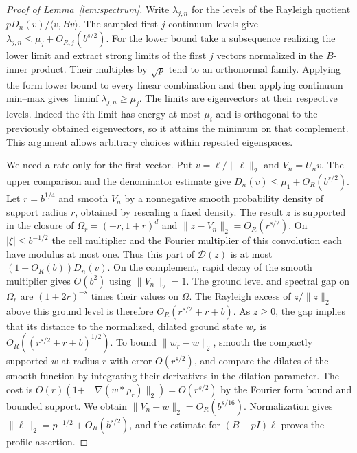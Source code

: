 \documentclass[11pt]{article}
\numberwithin{equation}{section}
\begin{document}
\begin{proof}[Proof of Lemma~\ref{lem:spectrum}]
Write \(\lambda_{j,n}\) for the levels of the Rayleigh quotient
\(pD_n(v)/\langle v,Bv\rangle\). The sampled first \(j\) continuum
levels give \(\lambda_{j,n}\le\mu_j+O_{R,j}(b^{s/2})\). For the
lower bound take a subsequence realizing the lower limit and extract
strong limits of the first \(j\) vectors normalized in the
\(B\)-inner product. Their multiples by \(\sqrt p\) tend to an
orthonormal family. Applying the form lower bound to every linear
combination and then applying continuum min--max gives
\(\liminf\lambda_{j,n}\ge\mu_j\). The limits are eigenvectors at
their respective levels. Indeed the $i$th limit has energy at most
\(\mu_i\) and is orthogonal to the previously obtained eigenvectors,
so it attains the minimum on that complement. This argument allows
arbitrary choices within repeated eigenspaces.

We need a rate only for the first vector. Put \(v=\ell/\|\ell\|_2\)
and \(V_n=U_n v\). The upper comparison and the denominator estimate
give \(D_n(v)\le\mu_1+O_R(b^{s/2})\). Let \(r=b^{1/4}\) and
smooth \(V_n\) by a nonnegative smooth probability density of
support radius \(r\), obtained by rescaling a fixed density.
The result \(z\) is supported in the closure of \(\Omega_r=(-r,1+r)^d\) and
\(\|z-V_n\|_2=O_R(r^{s/2})\). On \(|\xi|\le b^{-1/2}\) the
cell multiplier and the Fourier multiplier of this convolution
each have modulus at most one. Thus this part of \(\mathcal D(z)\)
is at most \((1+O_R(b))D_n(v)\). On the complement, rapid
decay of the smooth multiplier gives \(O(b^2)\) using
\(\|V_n\|_2=1\). The ground level and spectral gap on \(\Omega_r\)
are \((1+2r)^{-s}\) times their values on \(\Omega\).
The Rayleigh excess of \(z/\|z\|_2\) above this ground level is
therefore \(O_R(r^{s/2}+r+b)\). As \(z\ge0\), the gap implies
that its distance to the normalized, dilated ground state \(w_r\)
is \(O_R((r^{s/2}+r+b)^{1/2})\). To bound
\(\|w_r-w\|_2\), smooth the compactly supported \(w\)
at radius \(r\) with error \(O(r^{s/2})\), and compare the dilates
of the smooth function by integrating their derivatives in the
dilation parameter. The cost is
\(O(r)(1+\|\nabla(w*\rho_r)\|_2)=O(r^{s/2})\) by the Fourier
form bound and bounded support. We obtain
\(\|V_n-w\|_2=O_R(b^{s/16})\). Normalization gives
\(\|\ell\|_2=p^{-1/2}+O_R(b^{s/2})\), and the estimate for
\((B-pI)\ell\) proves the profile assertion.


\end{proof}
\end{document}
